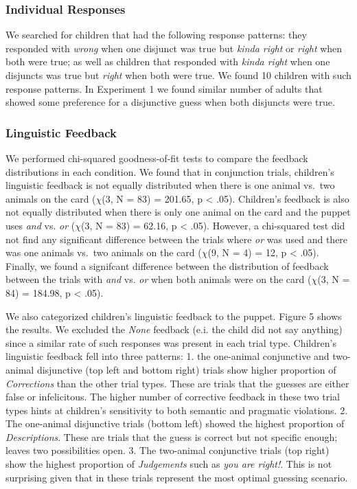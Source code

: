 \documentclass[10pt, letterpaper]{article}
\begin{document}
\subsubsection{Individual Responses}\label{individual-responses-1}

We searched for children that had the following response patterns: they
responded with \emph{wrong} when one disjunct was true but \emph{kinda
right} or \emph{right} when both were true; as well as children that
responded with \emph{kinda right} when one disjuncts was true but
\emph{right} when both were true. We found 10 children with such
response patterns. In Experiment 1 we found similar number of adults
that showed some preference for a disjunctive guess when both disjuncts
were true.

\subsubsection{Linguistic Feedback}\label{linguistic-feedback}

We performed chi-squared goodness-of-fit tests to compare the feedback
distributions in each condition. We found that in conjunction trials,
children's linguistic feedback is not equally distributed when there is
one animal vs.~two animals on the card (\(\chi\)(3, N = 83) = 201.65, p
\textless{} .05). Children's feedback is also not equally distributed
when there is only one animal on the card and the puppet uses \emph{and}
vs. \emph{or} (\(\chi\)(3, N = 83) = 62.16, p \textless{} .05). However,
a chi-squared test did not find any significant difference between the
trials where \emph{or} was used and there was one animals vs.~two
animals on the card (\(\chi\)(9, N = 4) = 12, p \textless{} .05).
Finally, we found a signifcant difference between the distribution of
feedback between the trials with \emph{and} vs. \emph{or} when both
animals were on the card (\(\chi\)(3, N = 84) = 184.98, p \textless{}
.05).

We also categorized children's linguistic feedback to the puppet. Figure
5 shows the results. We excluded the \emph{None} feedback (e.i. the
child did not say anything) since a similar rate of such responses was
present in each trial type. Children's linguistic feedback fell into
three patterns: 1. the one-animal conjunctive and two-animal disjunctive
(top left and bottom right) trials show higher proportion of
\emph{Corrections} than the other trial types. These are trials that the
guesses are either false or infelicitous. The higher number of
corrective feedback in these two trial types hints at children's
sensitivity to both semantic and pragmatic violations. 2. The one-animal
disjunctive trials (bottom left) showed the highest proportion of
\emph{Descriptions}. These are trials that the guess is correct but not
specific enough; leaves two possibilities open. 3. The two-animal
conjunctive trials (top right) show the highest proportion of
\emph{Judgements} such as \emph{you are right!}. This is not surprising
given that in these trials represent the most optimal guessing scenario.
\end{document}
